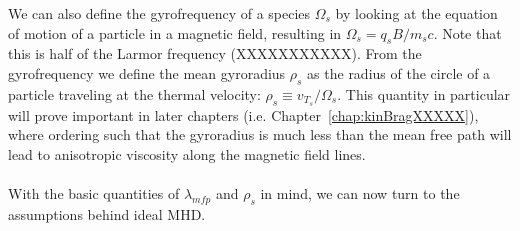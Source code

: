 We can also define the gyrofrequency of a species $\Omega_s$ by looking at the equation of motion of a particle in a magnetic field, resulting in $\Omega_s=q_sB/m_sc$. Note that this is half of the Larmor frequency (XXXXXXXXXXX). From the gyrofrequency we define the mean gyroradius $\rho_s$ as the radius of the circle of a particle traveling at the thermal velocity: $\rho_s\equiv v_{T_s}/\Omega_s$. This quantity in particular will prove important in later chapters (i.e. Chapter~\ref{chap:kinBragXXXXX}), where ordering such that the gyroradius is much less than the mean free path will lead to anisotropic viscosity along the magnetic field lines.\\
\\
With the basic quantities of $\lambda_{mfp}$ and $\rho_s$ in mind, we can now turn to the assumptions behind ideal MHD.


